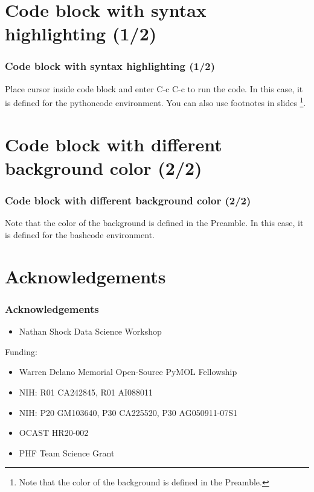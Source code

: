 \documentclass[aspectratio=169]{beamer}
\begin{document}
\section{Code block with syntax highlighting (1/2)}
\begin{frame}
\frametitle{Code block with syntax highlighting (1/2)}
\Large{
Place cursor inside code block and enter C-c C-c to run the code. 
In this case, it is defined for the pythoncode environment. You can also use footnotes in slides \footnote{Note that the color of the background is defined in the Preamble.}.}
\exampleCodeC
\end{frame}


\section{Code block with different background color (2/2)}
\begin{frame}
\frametitle{Code block with different background color (2/2)}
\exampleCodeC
\large{
Note that the color of the background is defined in the Preamble.
In this case, it is defined for the bashcode environment.
}
\end{frame}

\section{Acknowledgements}
\begin{frame}
\frametitle{Acknowledgements}
\Large{
\begin{itemize}[font=$\bullet$\scshape\bfseries]
    \item Nathan Shock Data Science Workshop
\end{itemize}
\vspace{2mm}
Funding:
\begin{itemize}[font=$\bullet$\scshape\bfseries]
    \item Warren Delano Memorial Open-Source PyMOL Fellowship
    \item NIH: R01 CA242845, R01 AI088011
    \item NIH: P20 GM103640, P30 CA225520, P30 AG050911-07S1 
    \item OCAST HR20-002
    \item PHF Team Science Grant
\end{itemize}
}
\end{frame}
\end{document}
